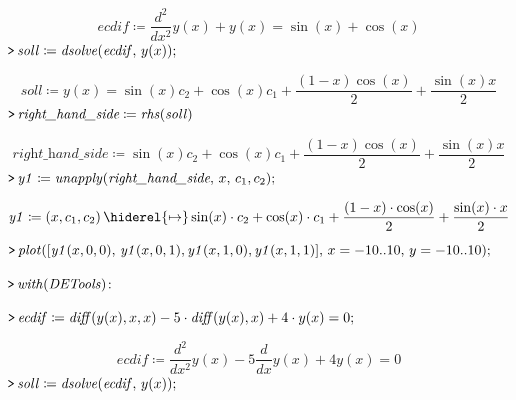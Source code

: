 \documentclass{article}
\begin{document}
\begin{dmath}\label{(16)}
\mathit{ecdif} \coloneqq \frac{d^{2}}{d x^{2}}y \! \left(x \right)+y \! \left(x \right)=\sin \! \left(x \right)+\cos \! \left(x \right)
\end{dmath}
\mapleinput
{$ \displaystyle \texttt{>\,} \mathit{soll} \coloneqq \mathit{dsolve} (\mathit{ecdif} ,\,y (x)); $}

\begin{dmath}\label{(17)}
\mathit{soll} \coloneqq y \! \left(x \right)=\sin \! \left(x \right) c_{2}+\cos \! \left(x \right) c_{1}+\frac{\left(1-x \right) \cos \! \left(x \right)}{2}+\frac{\sin \! \left(x \right) x}{2}
\end{dmath}
\mapleinput
{$ \displaystyle \texttt{>\,} \textit{right\_hand\_side} \coloneqq \mathit{rhs} (\mathit{soll}) $}

\begin{dmath}\label{(18)}
\textit{right\_hand\_side} \coloneqq \sin \! \left(x \right) c_{2}+\cos \! \left(x \right) c_{1}+\frac{\left(1-x \right) \cos \! \left(x \right)}{2}+\frac{\sin \! \left(x \right) x}{2}
\end{dmath}
\mapleinput
{$ \displaystyle \texttt{>\,} \mathit{y1} \coloneqq \mathit{unapply} (\textit{right\_hand\_side} ,\,x ,\,c_{1},c_{2}); $}

\begin{dmath}\label{(19)}
\mathit{y1} \coloneqq \left(x ,c_{1},c_{2}\right)\hiderel{\mapsto }\sin \! \left(x \right)\cdot c_{2}+\cos \! \left(x \right)\cdot c_{1}+\frac{\left(1-x \right)\cdot \cos \! \left(x \right)}{2}+\frac{\sin \! \left(x \right)\cdot x}{2}
\end{dmath}
\mapleinput
{$ \displaystyle \texttt{>\,} \mathit{plot} ([\mathit{y1} (x ,0,0),\,\mathit{y1} (x ,0,1),\mathit{y1} (x ,1,0),\mathit{y1} (x ,1,1)],\,x =-10..10,\,y =-10..10); $}

{}
\mapleinput
{$ \displaystyle \texttt{>\,} \mathit{with} (\mathit{DETools})\colon  $}

\mapleinput
{$ \displaystyle \texttt{>\,} \mathit{ecdif} \coloneqq \mathit{diff} (y (x),x ,x)-5\cdot \mathit{diff} (y (x),x)+4\cdot y (x)=0; $}

\begin{dmath}\label{(20)}
\mathit{ecdif} \coloneqq \frac{d^{2}}{d x^{2}}y \! \left(x \right)-5 \frac{d}{d x}y \! \left(x \right)+4 y \! \left(x \right)=0
\end{dmath}
\mapleinput
{$ \displaystyle \texttt{>\,} \mathit{soll} \coloneqq \mathit{dsolve} (\mathit{ecdif} ,\,y (x)); $}
\end{document}
